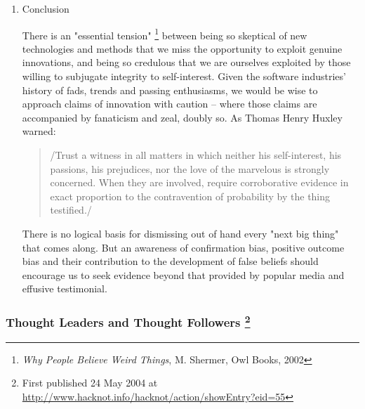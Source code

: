 \documentclass{article}
\begin{document}
\begin{enumerate}
The XPers have all their bases covered. No matter what the experience
report, there is no need to ever cast doubt upon XP itself -- there are
always rival causes to be blamed. \footnote{\url{http://c2.com/cgi/wiki?IfXpIsntWorkingYoureNotDoingXp}} In this way, XP becomes
nonfalsifiable.

\item Conclusion
\label{sec:orgheadline218}

There is an "essential tension" \footnote{\emph{Why People Believe Weird Things}, M. Shermer, Owl Books, 2002} between being so skeptical of new
technologies and methods that we miss the opportunity to exploit genuine
innovations, and being so credulous that we are ourselves exploited by
those willing to subjugate integrity to self-interest. Given the
software industries' history of fads, trends and passing enthusiasms, we
would be wise to approach claims of innovation with caution -- where
those claims are accompanied by fanaticism and zeal, doubly so. As
Thomas Henry Huxley warned:

\begin{quote}
/Trust a witness in all matters in which neither his self-interest,
his passions, his prejudices, nor the love of the marvelous is
strongly concerned. When they are involved, require corroborative
evidence in exact proportion to the contravention of probability by
the thing testified./
\end{quote}

There is no logical basis for dismissing out of hand every "next big
thing" that comes along. But an awareness of confirmation bias, positive
outcome bias and their contribution to the development of false beliefs
should encourage us to seek evidence beyond that provided by popular
media and effusive testimonial.
\end{enumerate}

\subsubsection{Thought Leaders and Thought Followers \footnote{First published 24 May 2004 at
\url{http://www.hacknot.info/hacknot/action/showEntry?eid=55}}}
\label{sec:orgheadline222}
\end{document}
